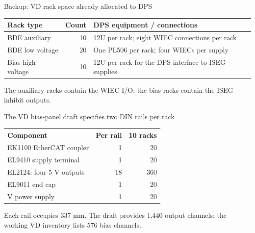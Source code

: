 \begin{frame}{Backup: VD rack space already allocated to DPS}
  \renewcommand{\arraystretch}{1.4}
  \begin{tabularx}{\textwidth}{@{}>{\RaggedRight\arraybackslash}p{3.4cm}r>{\RaggedRight\arraybackslash}X@{}}
    \toprule
    \textbf{Rack type} & \textbf{Count} & \textbf{DPS equipment / connections}\\
    \midrule
    BDE auxiliary & 10 & 12U per rack; eight WIEC connections per rack\\
    BDE low voltage & 20 & One PL506 per rack; four WIECs per supply\\
    Bias high voltage & 10 & 12U per rack for the DPS interface to ISEG supplies\\
    \bottomrule
  \end{tabularx}\par
  \bigskip
  The auxiliary racks contain the WIEC I/O; the bias racks contain the ISEG inhibit outputs.
\end{frame}

\begin{frame}{The VD bias-panel draft specifies two DIN rails per rack}
  \renewcommand{\arraystretch}{1.3}
  \begin{tabularx}{\textwidth}{@{}>{\RaggedRight\arraybackslash}Xrr@{}}
    \toprule
    \textbf{Component} & \textbf{Per rail} & \textbf{10 racks}\\
    \midrule
    EK1100 EtherCAT coupler & 1 & 20\\
    EL9410 supply terminal & 1 & 20\\
    EL2124: four 5 V outputs & 18 & 360\\
    EL9011 end cap & 1 & 20\\
    24 V power supply & 1 & 20\\
    \bottomrule
  \end{tabularx}\par
  \medskip
  Each rail occupies 337 mm. The draft provides 1,440 output channels;
  the working VD inventory lists 576 bias channels.\par
\end{frame}

